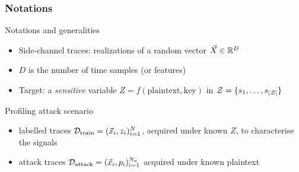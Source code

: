\begin{frame}
\frametitle{Notations}
\begin{block}{Notations and generalities}
\begin{itemize}
\item Side-channel traces: realizations of a random vector $\vec{X} \in \mathbb{R}^D$  
\item $D$ is the number of time samples (or features)
\item Target: a \emph{sensitive} variable $Z = f(\mathrm{plaintext,key})$ in $\mathcal{Z} = \{s_{1}, \dots, s_{|\mathcal{Z}|}\}$
\end{itemize}
\end{block}
\vspace{-5pt}
\begin{block}{Profiling attack scenario}
\begin{itemize}
\item labelled traces $\mathcal{D}_{\text{train}} = (\vec{x}_i, z_i)_{i=1}^N$, acquired under known $Z$, to characterise the signals
\item attack traces $\mathcal{D}_{\text{attack}} = (\vec{x}_i, p_i)_{i=1}^{N_a}$ acquired under known plaintext
\end{itemize}
\end{block}
\end{frame}




